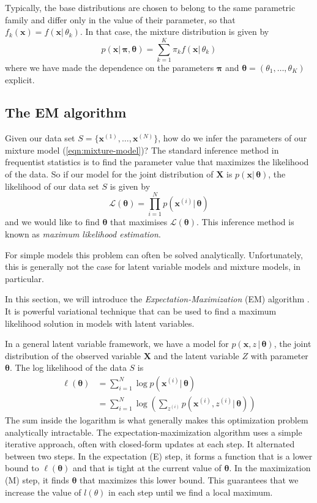 \documentclass[final,3p,times,twocolumn]{elsarticle}
\let\bs\boldsymbol
\begin{document}
Typically, the base distributions are chosen to belong to the same parametric family and differ only in the value of their parameter, so that $f_k(\bs x) = f(\bs x|\, \theta_k)$.
In that case, the mixture distribution is given by
\begin{equation}
\label{eqn:mixture-model}
p(\bs x|\,\bs\pi,\bs\theta) = \sum_{k=1}^K \pi_k f(\bs x|\,\theta_k)
\end{equation}
where we have made the dependence on the parameters $\bs\pi$ and $\bs\theta = (\theta_1,\dots,\theta_K)$ explicit.


\subsection{The EM algorithm}
\label{sect:EM}
Given our data set $S=\{\bs x^{(1)},\dots,\bs x^{(N)}\}$, how do we infer the parameters of our mixture model (\ref{eqn:mixture-model})?
The standard inference method in frequentist statistics is to find the parameter value that maximizes the likelihood of the data. 
So if our model for the joint distribution of $\bs X$ is $p(\bs x|\,\bs\theta)$, the likelihood of our data set $S$ is given by
\begin{equation}
\label{eqn:likelihood}
\mathcal{L}(\bs\theta) = \prod_{i=1}^N p(\bs x^{(i)}|\,\bs \theta)
\end{equation}
and we would like to find $\bs \theta$ that maximises $\mathcal{L}(\bs\theta)$.
This inference method is known as \emph{maximum likelihood estimation}. 

For simple models this problem can often be solved analytically.
Unfortunately, this is generally not the case for latent variable models and mixture models, in particular.

In this section, we will introduce the \emph{Expectation-Maximization} (EM) algorithm \cite{dempster1977}.
It is powerful variational technique that can be used to find a maximum likelihood solution in models with latent variables.

In a general latent variable framework, we have a model for $p(\bs x,z\,|\,\bs\theta)$, the joint distribution of the observed variable $\bs X$ and the latent variable $Z$ with parameter $\bs\theta$. 
The log likelihood of the data $S$ is 
\begin{equation}
\label{eqn:EMlikelihood}
\begin{split}
\ell(\bs\theta) &= \sum_{i=1}^N \log p(\bs x^{(i)}|\,\bs\theta)\\
&= \sum_{i=1}^N \log \left( \sum_{z^{(i)}} p(\bs x^{(i)},z^{(i)}|\,\bs\theta)\right)
\end{split}
\end{equation}
The sum inside the logarithm is what generally makes this optimization problem analytically intractable.
The expectation-maximization algorithm uses a simple iterative approach, often with closed-form updates at each step.
It alternated between two steps.
In the expectation (E) step, it forms a function that is a lower bound to $\ell(\bs\theta)$ and that is tight at the current value of $\bs\theta$.
In the maximization (M) step, it finds $\bs\theta$ that maximizes this lower bound.
This guarantees that we increase the value of $l(\theta)$ in each step until we find a local maximum.
\end{document}
